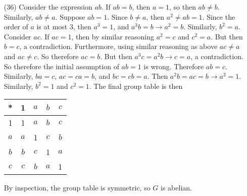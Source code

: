 \documentclass[12pt]{article}
\begin{document}
\begin{itemize}
\item[(36)]
Consider the expression $ab$. If $ab = b$, then $a = 1$, so then $ab \neq b$. Similarly, $ab \neq a$. Suppose $ab = 1$. Since $b \neq a$, then $a^2 \neq ab = 1$. Since the order of $a$ is at most 3, then $a^3 = 1$, and $a^3b = b \rightarrow a^2 = b$. Similarly, $b^2 = a$. Consider $ac$. If $ac = 1$, then by similar reasoning $a^2 = c$ and $c^2 = a$. But then $b = c$, a contradiction. Furthermore, using similar reasoning as above $ac \neq a$ and $ac \neq c$. So therefore $ac = b$. But then $a^3c = a^2b \rightarrow c = a$, a contradiction. So therefore the initial assumption of $ab = 1$ is wrong. Therefore $ab = c$. Similarly, $ba = c$, $ac = ca = b$, and $bc = cb = a$. Then $a^2b = ac = b \rightarrow a^2 = 1$. Similarly, $b^2 = 1$ and $c^2 = 1$. The final group table is then \\
\begin{center}
\begin{tabular}{| c || c | c | c | c |}
\hline
* & 1 & $a$ & $b$ & $c$ \\
\hline
\hline
1 & 1 & $a$ & $b$ & $c$ \\
\hline
$a$ & $a$ & 1 & $c$ & $b$ \\
\hline
$b$ & $b$ & $c$ & 1 & $a$ \\
\hline
$c$ & $c$ & $b$ & $a$ & 1 \\
\hline
\end{tabular}
\end{center}
By inspection, the group table is symmetric, so $G$ is abelian.
\end{itemize}
\end{document}
